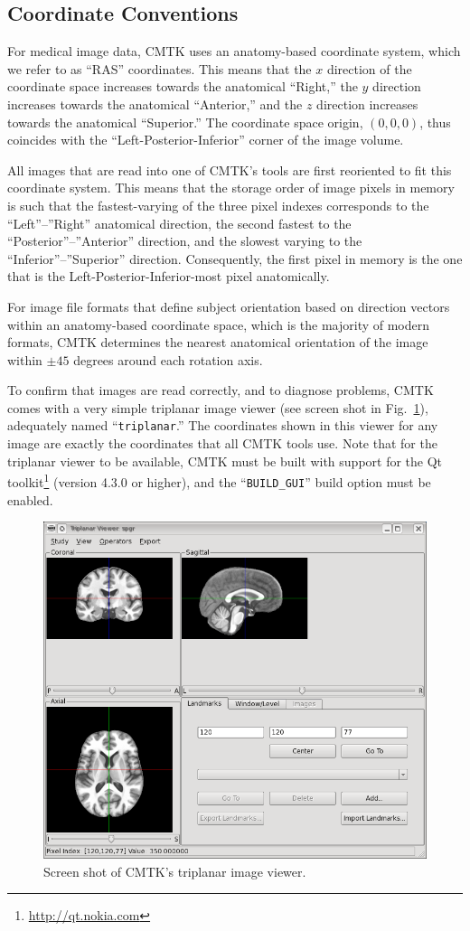 \documentclass{InsightArticle}
\begin{document}
\subsection{Coordinate Conventions}

For medical image data, CMTK uses an anatomy-based coordinate system, which we
refer to as ``RAS'' coordinates. This means that the $x$ direction of the
coordinate space increases towards the anatomical ``Right,'' the $y$ direction
increases towards the anatomical ``Anterior,'' and the $z$ direction increases
towards the anatomical ``Superior.'' The coordinate space origin, $(0,0,0)$,
thus coincides with the ``Left-Posterior-Inferior'' corner of the image
volume. 

All images that are read into one of CMTK's tools are first reoriented to fit
this coordinate system. This means that the storage order of image pixels in
memory is such that the fastest-varying of the three pixel indexes corresponds
to the ``Left''--''Right'' anatomical direction, the second fastest to the
``Posterior''--''Anterior'' direction, and the slowest varying to the
``Inferior''--''Superior'' direction. Consequently, the first pixel in memory
is the one that is the Left-Posterior-Inferior-most pixel anatomically.

For image file formats that define subject orientation based on direction
vectors within an anatomy-based coordinate space, which is the majority of
modern formats, CMTK determines the nearest anatomical orientation of the
image within $\pm 45$ degrees around each rotation axis.

To confirm that images are read correctly, and to diagnose problems, CMTK
comes with a very simple triplanar image viewer (see screen shot in
Fig.~\ref{fig:triplanar}), adequately named ``\verb|triplanar|.'' The
coordinates shown in this viewer for any image are exactly the coordinates
that all CMTK tools use. Note that for the triplanar viewer to be available,
CMTK must be built with support for the Qt
toolkit\footnote{\url{http://qt.nokia.com}} (version 4.3.0 or higher), and the
``\verb|BUILD_GUI|'' build option must be enabled.

\begin{figure}[tbp]
\centerline{\includegraphics[width=.5\linewidth]{img/triplanar}}
\caption{Screen shot of CMTK's triplanar image viewer.}
\label{fig:triplanar}
\end{figure}
\end{document}
